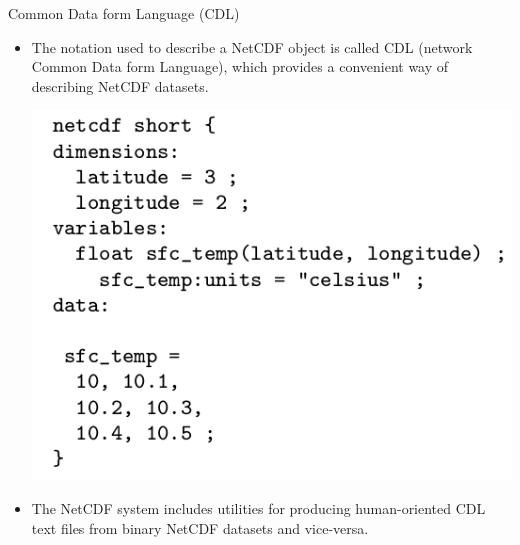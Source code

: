 \documentclass[compress,11pt,xcolor=svgnames,aspectratio=169]{beamer}
\begin{document}
\begin{frame}[fragile]{Common Data form Language (CDL)}

\begin{itemize}
\setlength\itemsep{0.3cm}

\item The notation used to describe a NetCDF object is called CDL (network Common Data form Language), which provides a convenient way of describing NetCDF datasets.

\begin{center}
\includegraphics[scale=0.4]{fig/short-nc}\vspace{-0.2cm}
\end{center}

\item The NetCDF system includes utilities for producing human-oriented CDL text files from binary NetCDF datasets and vice-versa.

\end{itemize}

\nocite{netcdf}

\end{frame}
\end{document}
